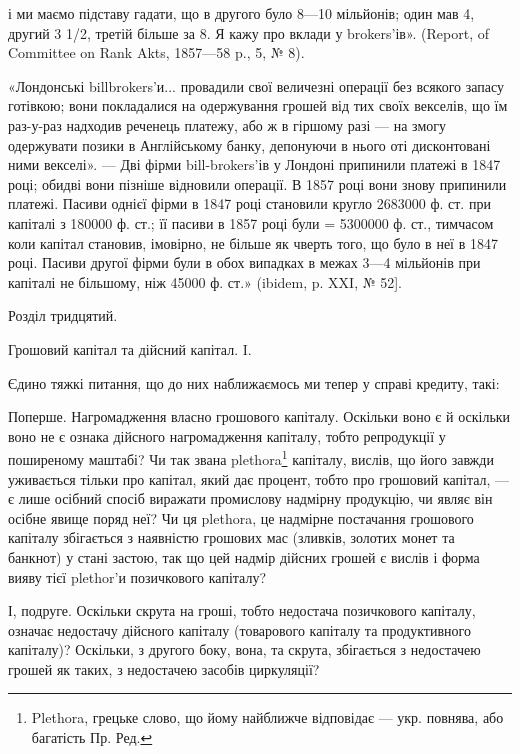 \parcont{}  %
і ми маємо підставу гадати, що в другого було 8—10 мільйонів; один мав 4,
другий 3 1/2, третій більше за 8. Я кажу про вклади у brokers’ів». (Report,
of Committee on Rank Akts, 1857—58 p., 5, № 8).

«Лондонські billbrokers’и... провадили свої величезні операції без всякого
запасу готівкою; вони покладалися на одержування грошей від тих своїх векселів,
що їм раз-у-раз надходив реченець платежу, або ж в гіршому разі — на змогу
одержувати позики в Англійському банку, депонуючи в нього оті дисконтовані
ними векселі». — Дві фірми bill-brokers’ів у Лондоні припинили платежі в
1847 році; обидві вони пізніше відновили операції. В 1857 році вони знову
припинили платежі. Пасиви однієї фірми в 1847 році становили кругло
2683000 ф. ст. при капіталі з 180000 ф. ст.; її пасиви в 1857 році були =
5300000 ф. ст., тимчасом коли капітал становив, імовірно, не більше як чверть
того, що було в неї в 1847 році. Пасиви другої фірми були в обох випадках
в межах 3—4 мільйонів при капіталі не більшому, ніж 45000 ф. ст.» (ibidem,
p. XXI, № 52].

Розділ тридцятий.

Грошовий капітал та дійсний капітал. I.

Єдино тяжкі питання, що до них наближаємось ми тепер у справі кредиту,
такі:

Поперше. Нагромадження власно грошового капіталу. Оскільки воно
є й оскільки воно не є ознака дійсного нагромадження капіталу, тобто репродукції
у поширеному маштабі? Чи так звана plethora\footnote*{
Plethora, грецьке слово, що йому найближче відповідає — укр. повнява, або багатість Пр. Ред.
} капіталу, вислів, що його
завжди уживається тільки про капітал, який дає процент, тобто про грошовий
капітал, — є лише осібний спосіб виражати промислову надмірну продукцію,
чи являє він осібне явище поряд неї? Чи ця plethora, це надмірне постачання
грошового капіталу збігається з наявністю грошових мас (зливків,
золотих монет та банкнот) у стані застою, так що цей надмір дійсних грошей
є вислів і форма вияву тієї plethor’и позичкового капіталу?

І, подруге. Оскільки скрута на гроші, тобто недостача позичкового капіталу,
означає недостачу дійсного капіталу (товарового капіталу та продуктивного
капіталу)? Оскільки, з другого боку, вона, та скрута, збігається з недостачею
грошей як таких, з недостачею засобів циркуляції?

